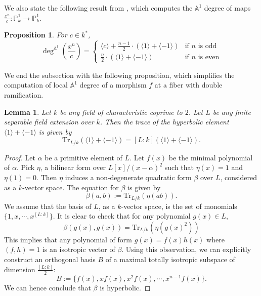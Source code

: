 \documentclass[12pt, reqno]{amsart}
\newtheorem{proposition}[theorem]{Proposition}
\newtheorem{lemma}[theorem]{Lemma}
\theoremstyle{definition}
\newcommand{\A}{\mathbb{A}} %
\newcommand{\Tr}{\mathrm{Tr}} %
\begin{document}
We also state the following result from \cite[Lemma 5]{kwBezout}, which computes the $\A^1$ degree of maps $\frac{x^n}{c}: \mathbb{P}^1_k \rightarrow \mathbb{P}^1_k$.
\begin{proposition}\label{adegpoly} \cite[Lemma 5]{kwBezout}
For $c \in k^*$, 
\begin{equation*}
    \deg^{\A^1} \left( \frac{x^n}{c} \right) = \begin{cases} \langle c \rangle + \frac{n-1}{2} \cdot (\langle 1 \rangle + \langle -1 \rangle) &\text{if } n \text{ is odd} \\ \frac{n}{2} \cdot (\langle 1 \rangle + \langle - 1 \rangle) & \text{if } n \text{ is even}  \end{cases}
\end{equation*}
\end{proposition}

We end the subsection with the following proposition, which simplifies the computation of local $\A^1$ degree of a morphism $f$ at a fiber with double ramification.
\begin{lemma}\label{TraceDoubleRamify}
Let $k$ be any field of characteristic coprime to $2$. Let $L$ be any finite separable field extension over $k$. Then the trace of the hyperbolic element $\langle 1 \rangle + \langle -1 \rangle$ is given by
\begin{equation*}
    \Tr_{L/k} (\langle 1 \rangle + \langle -1 \rangle) = [L:k] \left( \langle 1 \rangle + \langle -1 \rangle \right).
\end{equation*}
\end{lemma}
\begin{proof}
Let $\alpha$ be a primitive element of $L$. Let $f(x)$ be the minimal polynomial of $\alpha$. Pick $\eta$, a bilinear form over $L[x]/(x-\alpha)^2$ such that $\eta(x) = 1$ and $\eta(1) = 0$. Then $\eta$ induces a non-degenerate quadratic form $\beta$ over $L$, considered as a $k$-vector space. The equation for $\beta$ is given by
\begin{equation*}
    \beta(a, b) := \Tr_{L/k}(\eta(ab)).
\end{equation*}
We assume that the basis of $L$, as a $k$-vector space, is the set of monomials $\{1, x, \cdots, x^{[L:k]}\}$. It is clear to check that for any polynomial $g(x) \in L$,
\begin{equation*}
    \beta(g(x), g(x)) = \Tr_{L/k} ( \eta(g(x)^2))
\end{equation*}
This implies that any polynomial of form $g(x) = f(x)h(x)$ where $(f, h) = 1$ is an isotropic vector of $\beta$. Using this observation, we can explicitly construct an orthogonal basis $B$ of a maximal totally isotropic subspace of dimension $\frac{[L:k]}{2}$:
\begin{equation*}
    B := \{f(x), x f(x), x^2 f(x), \cdots, x^{n-1} f(x)\}.
\end{equation*}
We can hence conclude that $\beta$ is hyperbolic. 
\end{proof}
\end{document}
